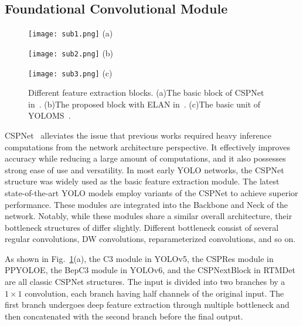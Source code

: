 \subsection{Foundational Convolutional Module}
\begin{figure}[htbp]  
    \centering  
    \begin{minipage}[b]{0.3\textwidth}  
        \centering  
        \texttt{[image: sub1.png]}  
        \footnotesize{(a) 
}  
    \end{minipage}  
    \hfill  
    \begin{minipage}[b]{0.29\textwidth}  
        \centering  
        \texttt{[image: sub2.png]}  
        \footnotesize{(b) 
}  
    \end{minipage}  
    \hfill  
    \begin{minipage}[b]{0.33\textwidth}  
        \centering  
        \texttt{[image: sub3.png]}  
        \footnotesize{(c) \\
         }  
    \end{minipage}  
    \caption{Different feature extraction blocks. (a)The basic block of CSPNet in~\cite{yolov5, ppyoloe, yolov6, rtmdet}. (b)The proposed block with ELAN in~\cite{yolov7, yolov8, yolov9, mafyolo, yolov10, yolo11}. (c)The basic unit of YOLOMS~\cite{yoloms}.}  
    \label{fig3}  
\end{figure}
CSPNet~\cite{cspnet} alleviates the issue that previous works required heavy inference computations from the network architecture perspective. It effectively improves accuracy while reducing a large amount of computations, and it also possesses strong ease of use and versatility. In most early YOLO networks, the CSPNet structure was widely used as the basic feature extraction module. The latest state-of-the-art YOLO models employ variants of the CSPNet to achieve superior performance. These modules are integrated into the Backbone and Neck of the network. Notably, while these modules share a similar overall architecture, their bottleneck structures of differ slightly. Different bottleneck consist of several regular convolutions, DW convolutions, reparameterized convolutions, and so on.

As shown in Fig.~\ref{fig3}(a), the C3 module in YOLOv5, the CSPRes module in PPYOLOE, the BepC3 module in YOLOv6, and the CSPNextBlock in RTMDet are all classic CSPNet structures. The input is divided into two branches by a $1 \times 1$ convolution, each branch having half channels of the original input. The first branch undergoes deep feature extraction through multiple bottleneck and then concatenated with the second branch before the final output.


